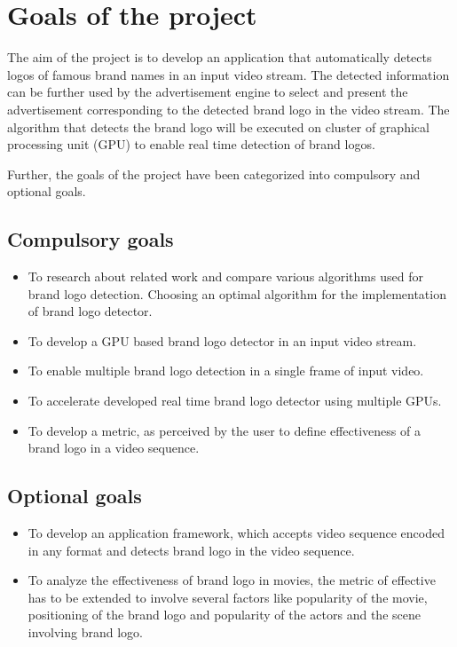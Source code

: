 \section{Goals of the project}

The aim of the project is to develop an application that automatically detects logos of famous brand names in an input video stream. The detected information can be further used by the advertisement engine to select and present the advertisement corresponding to the detected brand logo in the video stream. The algorithm that detects the brand logo will be executed on cluster of graphical processing unit (GPU) to enable real time detection of brand logos.

Further, the goals of the project have been categorized into compulsory and optional goals.  

\subsection{Compulsory goals} 
\begin{itemize}
	\item To research about related work and compare various algorithms used for brand logo detection. Choosing an optimal algorithm for the implementation of brand logo detector.
	
	\item To develop a GPU based brand logo detector in an input video stream.
	
	\item To enable multiple brand logo detection in a single frame of input video.
	
	\item To accelerate developed real time brand logo detector using multiple GPUs.
	
	\item To develop a metric, as perceived by the user to define effectiveness of a brand logo in a video sequence.   
\end{itemize} 

\subsection{Optional goals}
\begin{itemize}
	\item To develop an application framework, which accepts video sequence encoded in any format and detects brand logo in the video sequence.     
	
	\item To analyze the effectiveness of brand logo in movies, the metric of effective has to be extended to involve several factors like popularity of the movie, positioning of the brand logo and popularity of the actors and the scene involving brand logo. 
	
\end{itemize}     
 
